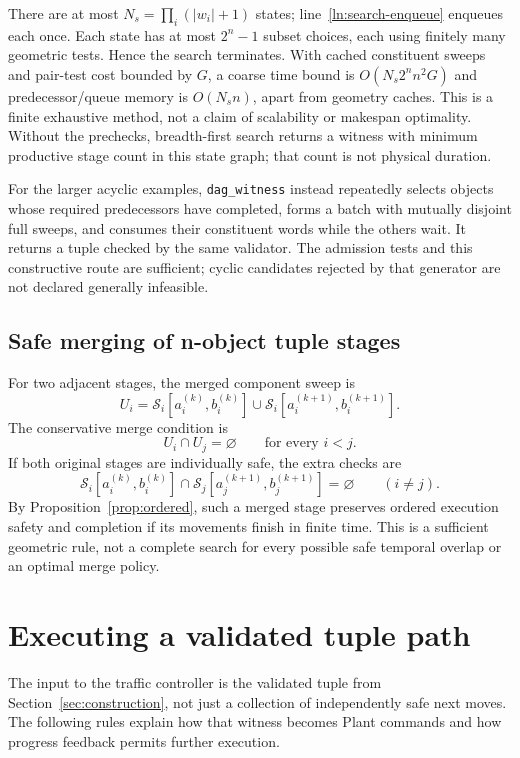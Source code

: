 \documentclass[11pt,a4paper]{article}
\theoremstyle{remark}
\newcommand{\Sw}{\mathcal S}
\begin{document}
There are at most $N_s=\prod_i(|w_i|+1)$ states; line~\ref{ln:search-enqueue}
enqueues each once. Each state has at most $2^n-1$ subset choices, each using
finitely many geometric tests. Hence the search terminates. With cached
constituent sweeps and pair-test cost bounded by $G$, a coarse time bound is
$O(N_s2^n n^2G)$ and predecessor/queue memory is $O(N_s n)$, apart from
geometry caches. This is a finite exhaustive method, not a claim of
scalability or makespan optimality. Without the prechecks, breadth-first
search returns a witness with minimum productive stage count in this state
graph; that count is not physical duration.

For the larger acyclic examples, \texttt{dag\_witness} instead repeatedly
selects objects whose required predecessors have completed, forms a batch
with mutually disjoint full sweeps, and consumes their constituent words
while the others wait. It returns a tuple checked by the same validator.
The admission tests and this constructive route are sufficient; cyclic
candidates rejected by that generator are not declared generally infeasible.

\subsection{Safe merging of n-object tuple stages}
For two adjacent stages, the merged component sweep is
\begin{equation}
 U_i=\Sw_i[a_i^{(k)},b_i^{(k)}]\cup
     \Sw_i[a_i^{(k+1)},b_i^{(k+1)}].
 \label{eq:merged-union}
\end{equation}
The conservative merge condition is
\begin{equation}
 U_i\cap U_j=\varnothing\qquad\text{for every }i<j.
 \label{eq:merge-safe}
\end{equation}
If both original stages are individually safe, the extra checks are
\begin{equation}
 \Sw_i[a_i^{(k)},b_i^{(k)}]\cap
 \Sw_j[a_j^{(k+1)},b_j^{(k+1)}]=\varnothing\qquad(i\ne j).
 \label{eq:merge-cross}
\end{equation}
By Proposition~\ref{prop:ordered}, such a merged stage preserves ordered
execution safety and completion if its movements finish in finite time.
This is a sufficient geometric rule, not a complete search for every possible
safe temporal overlap or an optimal merge policy.

\section{Executing a validated tuple path}
\label{sec:execution}
The input to the traffic controller is the validated tuple from
Section~\ref{sec:construction}, not just a collection of independently safe
next moves. The following rules explain how that witness becomes Plant
commands and how progress feedback permits further execution.
\end{document}

